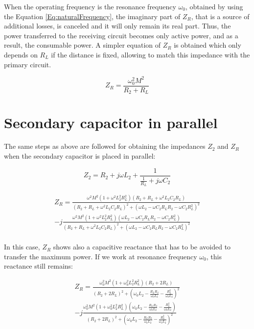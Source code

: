 When the operating frequency is the resonance frequency $\omega_0$, obtained by using the Equation \ref{Eq:naturalFrequency}, the imaginary part of $Z_R$, that is a source of additional losses, is canceled and it will only remain its real part. Thus, the power transferred to the receiving circuit becomes only active power, and as a result, the consumable power. A simpler equation of $Z_R$ is obtained which only depends on $R_L$ if the distance is fixed, allowing to match this impedance with the primary circuit.

\begin{equation}
Z_R = \frac{\omega_0^{2}M^{2}}{R_2+R_L}
\end{equation}

\section{Secondary capacitor in parallel}\label{sec:secondaryP}

The same steps as above are followed for obtaining the impedances $Z_2$ and $Z_R$ when the secondary capacitor is placed in parallel: 

\begin{equation}
Z_2 = R_2+j\omega{L_2}+\frac{1}{\frac{1}{R_L}+j\omega{C_2}} 
\end{equation}

\begin{equation} \label{eq:SecParZR}
\begin{aligned}
Z_R = \frac{\omega^{2}M^{2}(1+\omega^{2}L_2^{2}R_L^{2})(R_2+R_L+\omega^{2}L_2C_2R_L)}{(R_2+R_L+\omega^{2}L_2C_2R_L)^{2}+(\omega L_2-\omega C_2R_LR_2-\omega C_2R_L^{2})^{2}} \\[10pt]
-j\frac{\omega^{2}M^{2}(1+\omega^{2}L_2^{2}R_L^{2})(\omega L_2-\omega C_2R_LR_2-\omega C_2R_L^{2})}{(R_2+R_L+\omega^{2}L_2C_2R_L)^{2}+(\omega L_2-\omega C_2R_LR_2-\omega C_2R_L^{2})^{2}}
\end{aligned}
\end{equation}
\\

In this case, $Z_R$ shows also a capacitive reactance that has to be avoided to transfer the maximum power. If we work at resonance frequency $\omega_0$, this reactance still remains:

\begin{equation}
\begin{aligned}
Z_R = \frac{\omega_0^{2}M^{2}(1+\omega_0^{2}L_2^{2}R_L^{2})(R_2+2R_L)}{(R_2+2R_L)^{2}+(\omega_0 L_2-\frac{R_LR_2}{\omega_0L_2}-\frac{R_L^{2}}{\omega_0L_2})^{2}} \\[10pt]
-j\frac{\omega_0^{2}M^{2}(1+\omega_0^{2}L_2^{2}R_L^{2})(\omega_0 L_2-\frac{R_LR_2}{\omega_0L_2}-\frac{R_L^{2}}{\omega_0L_2})}{(R_2+2R_L)^{2}+(\omega_0 L_2-\frac{R_LR_2}{\omega_0L_2}-\frac{R_L^{2}}{\omega_0L_2})^{2}}
\end{aligned}
\end{equation}
\\

